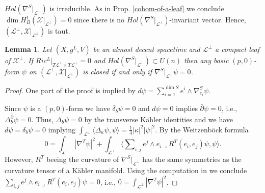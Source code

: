 \documentclass[a4paper,10pt,twoside]{amsart}
\newtheorem{lemma}[theorem]{Lemma}
\theoremstyle{definition}
\theoremstyle{remark}
\numberwithin{equation}{section}
\begin{document}
$Hol(\nabla^{S}|_{\mathcal{L}^{\perp}})$ is irreducible. As in Prop. \ref{cohom-of-a-leaf} we conclude
$\dim H^{1}_{B}(\mathcal{X}|_{\mathcal{L}^{\perp}})=0$ since there is no $Hol(\nabla^{S}|_{\mathcal{L}^{\perp}})$-invariant vector. Hence,
$(\mathcal{L}^{\perp},\mathcal{X}|_{\mathcal{L}^{\perp}})$ is taut.
\begin{lemma}\label{transverse-calabi-yau-betti}
	Let $(X,g^{L},V)$ be an almost decent spacetime and $\mathcal{L}^{\perp}$ a compact leaf of $\mathcal{X}^{\perp}$. If
	$Ric^{L}|_{T\mathcal{L}^{\perp} \times T\mathcal{L}^{\perp}}=0$ and $Hol(\nabla^{S}|_{\mathcal{L}^{\perp}}) \subset U(n)$ then
	any basic $(p,0)$-form $\psi$ on $(\mathcal{L}^{\perp},\mathcal{X}|_{\mathcal{L}^{\perp}})$ is closed if and only
	if $\nabla^{S}|_{\mathcal{L}^{\perp}}{\psi}=0$.
\end{lemma}
\begin{proof}
	One part of the proof is implied by $d\psi = \sum_{i=1}^{\dim S}{e^{i} \wedge \nabla^{S}_{e_{i}}\psi}$.\par
	Since $\psi$ is a $(p,0)$-form we have $\bar{\delta}_{b}\psi=0$ and $d\psi=0$ implies $\bar{\partial}\psi=0$, i.e.,
	$\Delta_{b}^{\bar{\partial}}\psi = 0$. Thus, $\Delta_{b}\psi=0$ by the transverse K\"{a}hler identities \cite{MR1146730} and we have
	$d\psi =\delta_{b}\psi =0$ implying $\int_{\mathcal{L}^{\perp}}{{\langle{{\Delta_{\kappa}\psi}},{{\psi}}\rangle}}=\frac{1}{4}|\kappa|^{2}|\psi|^{2}$. By the
	Weitzenb\"{o}ck formula
	\begin{equation*}
		0 = \int_{\mathcal{L}^{\perp}}{|\nabla^{T}\psi|^{2}}
				+ \int_{\mathcal{L}^{\perp}}{{\langle{{\sum\nolimits_{i,j}{e^{j} \wedge e_{i} \lrcorner R^{T}(e_{i},e_{j})\psi}}},{{\psi}}\rangle}}.
	\end{equation*}
	However, $R^{T}$ beeing the curvature of $\nabla^{S}|_{\mathcal{L}^{\perp}}$ has the same symmetries as the curvature tensor of a K\"{a}hler
	manifold. Using the computation in \cite[Prop. 6.2.4]{MR1787733} we conclude
	$\sum_{i,j}{e^{j} \wedge e_{i} \lrcorner R^{T}(e_{i},e_{j})\psi}=0$, i.e., $0 = \int_{\mathcal{L}^{\perp}}{|\nabla^{T}\psi|^{2}}$.
\end{proof}
\end{document}
